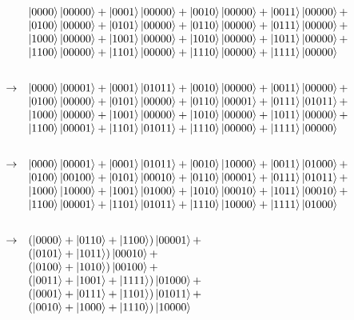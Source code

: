 \documentclass{article}
\begin{document}
\[\begin{array}{rcl}
&&   \ket{0000}\ket{00000} +
     \ket{0001}\ket{00000} +
     \ket{0010}\ket{00000} +
     \ket{0011}\ket{00000} + \\
&&     \ket{0100}\ket{00000} + 
     \ket{0101}\ket{00000} +
     \ket{0110}\ket{00000} +
     \ket{0111}\ket{00000} + \\
&&     \ket{1000}\ket{00000} +
     \ket{1001}\ket{00000} + 
     \ket{1010}\ket{00000} +
     \ket{1011}\ket{00000} + \\
&&     \ket{1100}\ket{00000} +
     \ket{1101}\ket{00000} +
     \ket{1110}\ket{00000} +
     \ket{1111}\ket{00000} \\[2em]
&\rightarrow&
     \ket{0000}\ket{00001} +
     \ket{0001}\ket{01011} +
     \ket{0010}\ket{00000} +
     \ket{0011}\ket{00000} + \\
&&     \ket{0100}\ket{00000} + 
     \ket{0101}\ket{00000} +
     \ket{0110}\ket{00001} +
     \ket{0111}\ket{01011} + \\
&&     \ket{1000}\ket{00000} +
     \ket{1001}\ket{00000} + 
     \ket{1010}\ket{00000} +
     \ket{1011}\ket{00000} + \\
&&     \ket{1100}\ket{00001} +
     \ket{1101}\ket{01011} +
     \ket{1110}\ket{00000} +
     \ket{1111}\ket{00000} \\[2em]
&\rightarrow&
     \ket{0000}\ket{00001} +
     \ket{0001}\ket{01011} +
     \ket{0010}\ket{10000} +
     \ket{0011}\ket{01000} + \\
&&     \ket{0100}\ket{00100} + 
     \ket{0101}\ket{00010} +
     \ket{0110}\ket{00001} +
     \ket{0111}\ket{01011} + \\
&&     \ket{1000}\ket{10000} +
     \ket{1001}\ket{01000} + 
     \ket{1010}\ket{00010} +
     \ket{1011}\ket{00010} + \\
&&     \ket{1100}\ket{00001} +
     \ket{1101}\ket{01011} +
     \ket{1110}\ket{10000} +
     \ket{1111}\ket{01000} \\[2em]
&\rightarrow&
     (\ket{0000}+\ket{0110}+\ket{1100})\ket{00001} + \\
&&   (\ket{0101}+\ket{1011})\ket{00010} + \\
&&   (\ket{0100}+\ket{1010})\ket{00100} + \\
&&   (\ket{0011}+\ket{1001}+\ket{1111})\ket{01000} + \\
&&   (\ket{0001}+\ket{0111}+\ket{1101})\ket{01011} + \\
&&   (\ket{0010}+\ket{1000}+\ket{1110})\ket{10000} 
\end{array}\]
\end{document}
